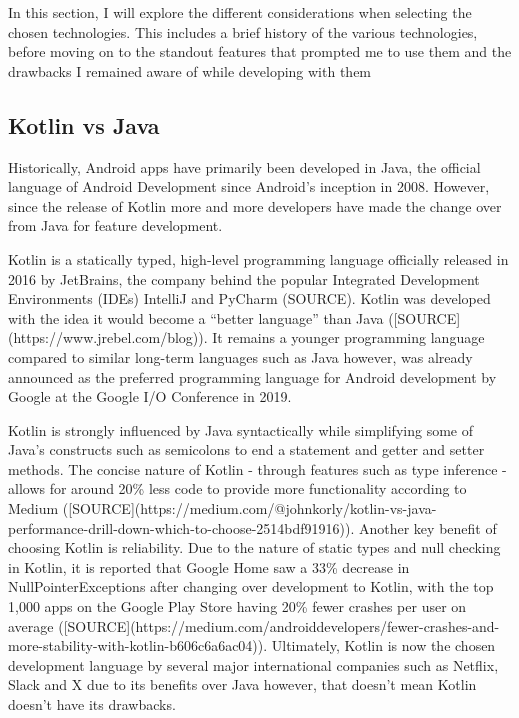 \documentclass{l4proj}
\begin{document}
In this section, I will explore the different considerations when selecting the chosen technologies. This includes a brief history of the various technologies, before moving on to the standout features that prompted me to use them and the drawbacks I remained aware of while developing with them

\subsection{Kotlin vs Java}
\label{sec:kotlinvsjava}

Historically, Android apps have primarily been developed in Java, the official language of Android Development since Android’s inception in 2008. However, since the release of Kotlin more and more developers have made the change over from Java for feature development.

Kotlin is a statically typed, high-level programming language officially released in 2016 by JetBrains, the company behind the popular Integrated Development Environments (IDEs) IntelliJ and PyCharm (SOURCE). Kotlin was developed with the idea it would become a “better language” than Java ([SOURCE](https://www.jrebel.com/blog)). It remains a younger programming language compared to similar long-term languages such as Java however, was already announced as the preferred programming language for Android development by Google at the Google I/O Conference in 2019.

Kotlin is strongly influenced by Java syntactically while simplifying some of Java’s constructs such as semicolons to end a statement and getter and setter methods. The concise nature of Kotlin - through features such as type inference - allows for around 20\% less code to provide more functionality according to Medium ([SOURCE](https://medium.com/@johnkorly/kotlin-vs-java-performance-drill-down-which-to-choose-2514bdf91916)). Another key benefit of choosing Kotlin is reliability. Due to the nature of static types and null checking in Kotlin, it is reported that Google Home saw a 33\% decrease in NullPointerExceptions after changing over development to Kotlin, with the top 1,000 apps on the Google Play Store having 20\% fewer crashes per user on average ([SOURCE](https://medium.com/androiddevelopers/fewer-crashes-and-more-stability-with-kotlin-b606c6a6ac04)). Ultimately, Kotlin is now the chosen development language by several major international companies such as Netflix, Slack and X due to its benefits over Java however, that doesn’t mean Kotlin doesn’t have its drawbacks.
\end{document}
